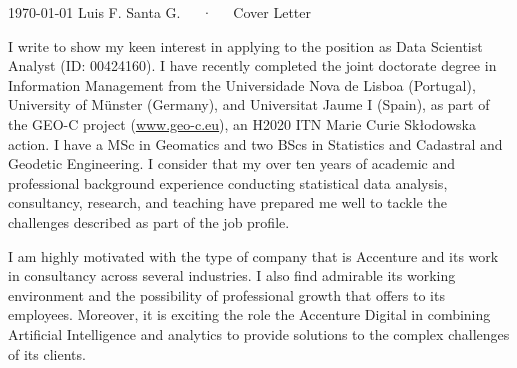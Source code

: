 \documentclass[11pt, a4paper]{awesome-cv}
\begin{document}
\makecvheader[R]

\makecvfooter
  {\today}
    {Luis F. Santa G.~~~·~~~Cover Letter}
  {}

\makelettertitle

\begin{cvletter}
I write to show my keen interest in applying to the position as Data Scientist Analyst (ID: 00424160). I have recently completed the joint doctorate degree in Information Management from the Universidade Nova de Lisboa (Portugal), University of Münster (Germany), and Universitat Jaume I (Spain), as part of the GEO-C project (\url{www.geo-c.eu}), an H2020 ITN Marie Curie Skłodowska action. I have a MSc in Geomatics and two BScs in Statistics and Cadastral and Geodetic Engineering. I consider that my over ten years of academic and professional background experience conducting statistical data analysis, consultancy, research, and teaching have prepared me well to tackle the challenges described as part of the job profile.\par
I am highly motivated with the type of company that is Accenture and its work in consultancy across several industries. I also find admirable its working environment and the possibility of professional growth that offers to its employees. Moreover, it is exciting the role the Accenture Digital in combining Artificial Intelligence and analytics to provide solutions to the complex challenges of its clients.\par

\end{cvletter}
\end{document}
